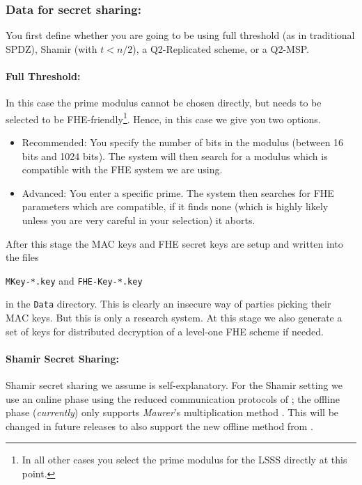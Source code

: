 \subsubsection{Data for secret sharing:}
You first define whether you are going to be using full threshold (as in
traditional SPDZ), Shamir (with $t<n/2$), a Q2-Replicated scheme, or 
a Q2-MSP.

\paragraph{Full Threshold:}
In this case the prime modulus cannot be chosen directly, but
needs to be selected to be FHE-friendly\footnote{In all other cases you select the prime modulus for the LSSS directly at this point.}.
Hence, in this case we give you two options.
\begin{itemize}
\item Recommended: You specify the number of bits in the modulus
(between 16 bits and 1024 bits).  The system will then
search for a modulus which is compatible with the FHE system we are
using.
\item Advanced: You enter a specific prime. The system then searches
for FHE parameters which are compatible, if it finds none (which is highly
likely unless you are very careful in your selection) it aborts.
\end{itemize}
After this stage the MAC keys and FHE secret keys are setup and written into the
files 
\begin{center}
\verb+MKey-*.key+ and \verb+FHE-Key-*.key+ 
\end{center}
in the \verb+Data+ directory. 
This is clearly an insecure way of parties picking their MAC keys. But this is only a
research system. 
At this stage we also generate a set of keys
for distributed decryption of a level-one FHE scheme if needed.
\iffalse XXXX
For the case of fake offline we assume these keys are on {\em each} computer,
but using fake offline is only for test purposes in any case.
\fi

\paragraph{Shamir Secret Sharing:}
Shamir secret sharing we assume is self-explanatory.
For the Shamir setting we use an online phase using the reduced communication
protocols of \cite{KRSW}; 
the offline phase ({\em currently}) only supports {\em Maurer}'s multiplication method
\cite{Maurer}.
This will be changed in future releases to also support the new offline method from
\cite{SW18}.


